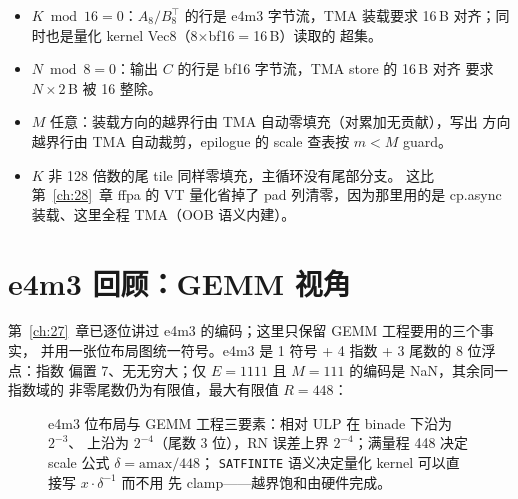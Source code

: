 \begin{itemize}[itemsep=1pt,topsep=2pt]
  \item $K \bmod 16 = 0$：$A_8/B_8^{\top}$ 的行是 e4m3 字节流，TMA 装载要求
        16\,B 对齐；同时也是量化 kernel Vec8（8$\times$bf16$=$16\,B）读取的
        超集。
  \item $N \bmod 8 = 0$：输出 $C$ 的行是 bf16 字节流，TMA store 的 16\,B 对齐
        要求 $N\times 2$\,B 被 16 整除。

  \item $M$ 任意：装载方向的越界行由 TMA 自动零填充（对累加无贡献），写出
        方向越界行由 TMA 自动裁剪，epilogue 的 scale 查表按 $m<M$ guard。
  \item $K$ 非 128 倍数的尾 tile 同样零填充，主循环没有尾部分支。
        这比第~\ref{ch:28}~章 ffpa 的 VT 量化省掉了 pad 列清零，因为那里用的是
        cp.async 装载、这里全程 TMA（OOB 语义内建）。
\end{itemize}

\section{e4m3 回顾：GEMM 视角}\label{sec:34-e4m3}

第~\ref{ch:27}~章已逐位讲过 e4m3 的编码；这里只保留 GEMM 工程要用的三个事实，
并用一张位布局图统一符号。e4m3 是 1 符号 + 4 指数 + 3 尾数的 8 位浮点：指数
偏置 7、无无穷大；仅 $E=1111$ 且 $M=111$ 的编码是 NaN，其余同一指数域的
非零尾数仍为有限值，最大有限值 $R=448$：

\begin{figure}[H]
\centering
{}
\caption{e4m3 位布局与 GEMM 工程三要素：相对 ULP 在 binade 下沿为 $2^{-3}$、
上沿为 $2^{-4}$（尾数 3 位），RN 误差上界 $2^{-4}$；满量程 448 决定 scale 公式 $\delta=\mathrm{amax}/448$；
\texttt{SATFINITE} 语义决定量化 kernel 可以直接写 $x\cdot\delta^{-1}$ 而不用
先 clamp——越界饱和由硬件完成。}
\label{fig:34-e4m3}
\end{figure}

